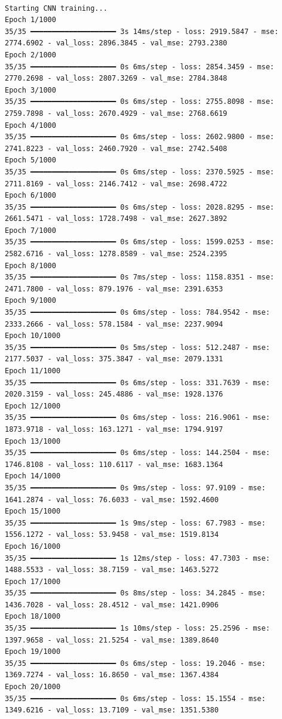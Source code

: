 \documentclass[
  letterpaper,
  DIV=11,
  numbers=noendperiod]{scrreprt}
\begin{document}
\begin{verbatim}

Starting CNN training...
Epoch 1/1000
35/35 ━━━━━━━━━━━━━━━━━━━━ 3s 14ms/step - loss: 2919.5847 - mse: 2774.6902 - val_loss: 2896.3845 - val_mse: 2793.2380
Epoch 2/1000
35/35 ━━━━━━━━━━━━━━━━━━━━ 0s 6ms/step - loss: 2854.3459 - mse: 2770.2698 - val_loss: 2807.3269 - val_mse: 2784.3848
Epoch 3/1000
35/35 ━━━━━━━━━━━━━━━━━━━━ 0s 6ms/step - loss: 2755.8098 - mse: 2759.7898 - val_loss: 2670.4929 - val_mse: 2768.6619
Epoch 4/1000
35/35 ━━━━━━━━━━━━━━━━━━━━ 0s 6ms/step - loss: 2602.9800 - mse: 2741.8223 - val_loss: 2460.7920 - val_mse: 2742.5408
Epoch 5/1000
35/35 ━━━━━━━━━━━━━━━━━━━━ 0s 6ms/step - loss: 2370.5925 - mse: 2711.8169 - val_loss: 2146.7412 - val_mse: 2698.4722
Epoch 6/1000
35/35 ━━━━━━━━━━━━━━━━━━━━ 0s 6ms/step - loss: 2028.8295 - mse: 2661.5471 - val_loss: 1728.7498 - val_mse: 2627.3892
Epoch 7/1000
35/35 ━━━━━━━━━━━━━━━━━━━━ 0s 6ms/step - loss: 1599.0253 - mse: 2582.6716 - val_loss: 1278.8589 - val_mse: 2524.2395
Epoch 8/1000
35/35 ━━━━━━━━━━━━━━━━━━━━ 0s 7ms/step - loss: 1158.8351 - mse: 2471.7800 - val_loss: 879.1976 - val_mse: 2391.6353
Epoch 9/1000
35/35 ━━━━━━━━━━━━━━━━━━━━ 0s 6ms/step - loss: 784.9542 - mse: 2333.2666 - val_loss: 578.1584 - val_mse: 2237.9094
Epoch 10/1000
35/35 ━━━━━━━━━━━━━━━━━━━━ 0s 5ms/step - loss: 512.2487 - mse: 2177.5037 - val_loss: 375.3847 - val_mse: 2079.1331
Epoch 11/1000
35/35 ━━━━━━━━━━━━━━━━━━━━ 0s 6ms/step - loss: 331.7639 - mse: 2020.3159 - val_loss: 245.4886 - val_mse: 1928.1376
Epoch 12/1000
35/35 ━━━━━━━━━━━━━━━━━━━━ 0s 6ms/step - loss: 216.9061 - mse: 1873.9718 - val_loss: 163.1271 - val_mse: 1794.9197
Epoch 13/1000
35/35 ━━━━━━━━━━━━━━━━━━━━ 0s 6ms/step - loss: 144.2504 - mse: 1746.8108 - val_loss: 110.6117 - val_mse: 1683.1364
Epoch 14/1000
35/35 ━━━━━━━━━━━━━━━━━━━━ 0s 9ms/step - loss: 97.9109 - mse: 1641.2874 - val_loss: 76.6033 - val_mse: 1592.4600
Epoch 15/1000
35/35 ━━━━━━━━━━━━━━━━━━━━ 1s 9ms/step - loss: 67.7983 - mse: 1556.1272 - val_loss: 53.9458 - val_mse: 1519.8134
Epoch 16/1000
35/35 ━━━━━━━━━━━━━━━━━━━━ 1s 12ms/step - loss: 47.7303 - mse: 1488.5533 - val_loss: 38.7159 - val_mse: 1463.5272
Epoch 17/1000
35/35 ━━━━━━━━━━━━━━━━━━━━ 0s 8ms/step - loss: 34.2845 - mse: 1436.7028 - val_loss: 28.4512 - val_mse: 1421.0906
Epoch 18/1000
35/35 ━━━━━━━━━━━━━━━━━━━━ 1s 10ms/step - loss: 25.2596 - mse: 1397.9658 - val_loss: 21.5254 - val_mse: 1389.8640
Epoch 19/1000
35/35 ━━━━━━━━━━━━━━━━━━━━ 0s 6ms/step - loss: 19.2046 - mse: 1369.7274 - val_loss: 16.8650 - val_mse: 1367.4384
Epoch 20/1000
35/35 ━━━━━━━━━━━━━━━━━━━━ 0s 6ms/step - loss: 15.1554 - mse: 1349.6216 - val_loss: 13.7109 - val_mse: 1351.5380

\end{verbatim}
\end{document}
